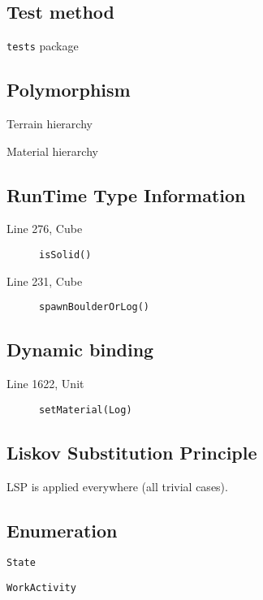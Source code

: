 \documentclass[]{article}
\begin{document}
\subsection{Test method}
	\begin{description}
		\item \texttt{tests} package
	\end{description}

\subsection{Polymorphism}
	\begin{description}
		\item Terrain hierarchy
		\item Material hierarchy
	\end{description}
	
\subsection{RunTime Type Information}
	\begin{description}
		\item[Line 276, Cube] \texttt{isSolid()}
		\item[Line 231, Cube] \texttt{spawnBoulderOrLog()}
	\end{description}

\subsection{Dynamic binding}
	\begin{description}
		\item[Line 1622, Unit] \texttt{setMaterial(Log)}
	\end{description}
	
\subsection{Liskov Substitution Principle}
	\begin{description}
		\item LSP is applied everywhere (all trivial cases).
	\end{description}
	
\subsection{Enumeration}
	\begin{description}
		\item \texttt{State}
		\item \texttt{WorkActivity}
	\end{description}
	
\end{document}
